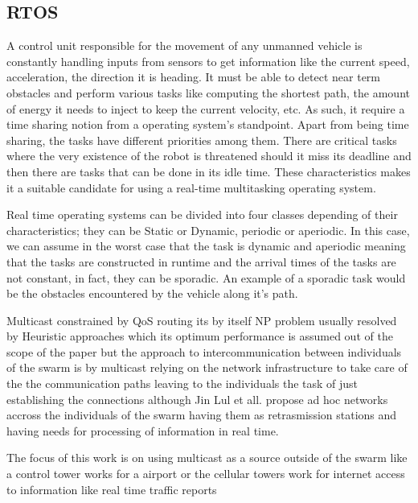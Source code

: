 \documentclass[journal]{IEEEtran}
\begin{document}
\subsection{RTOS}
A control unit responsible for the movement of any unmanned vehicle is constantly handling inputs from sensors to get information like the current speed, acceleration, the direction it is heading. It must be able to detect near term obstacles and perform various tasks like computing the shortest path, the amount of energy it needs to inject to keep the current velocity, etc. As such, it require a time sharing notion from a operating system's standpoint. Apart from being time sharing, the tasks have different priorities among them. There are critical tasks where the very existence of the robot is threatened should it miss its deadline and then there are tasks that can be done in its idle time. These characteristics makes it a suitable candidate for using a real-time multitasking operating system.

Real time operating systems can be divided into four classes depending of their characteristics; they can be Static or Dynamic, periodic or aperiodic. In this case, we can assume in the worst case that the task is dynamic and aperiodic meaning that the tasks are constructed in runtime and the arrival times of the tasks are not constant, in fact, they can be sporadic. An example of a sporadic task would be the obstacles encountered by the vehicle along it's path.

Multicast constrained by QoS routing its by itself NP problem usually resolved by Heuristic approaches \cite{HH1} which its optimum performance is assumed out of the scope of the paper but the approach to  intercommunication between individuals of the swarm is by multicast relying on the network infrastructure to take care of the the communication paths leaving to the individuals the task of just establishing the connections although Jin Lul et all. \cite{HH2} propose ad hoc networks accross the individuals of the swarm having them as retrasmission stations and having needs for processing of information in real time.

The focus of this work is on using multicast as a source outside of the swarm like a control tower works for a airport or the cellular towers work for internet access to information like real time traffic reports\cite{YS1}
\end{document}
